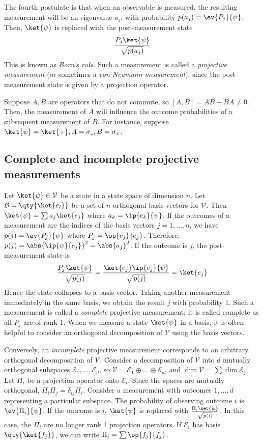 The fourth postulate is that when an observable is measured, the resulting measurement will be an eigenvalue \( a_j \), with probability \( p(a_j) = \ev{P_j}{\psi} \).
Then, \( \ket{\psi} \) is replaced with the post-measurement state
\[ \frac{P_j \ket{\psi}}{\sqrt{p(a_j)}} \]
This is known as \emph{Born's rule}.
Such a measurement is called a \emph{projective measurement} (or sometimes a \emph{von Neumann measurement}), since the post-measurement state is given by a projection operator.

Suppose \( A, B \) are operators that do not commute, so \( [A,B] = AB - BA \neq 0 \).
Then, the measurement of \( A \) will influence the outcome probabilities of a subsequent measurement of \( B \).
For instance, suppose \( \ket{\psi} = \ket{+}, A = \sigma_z, B = \sigma_x \).

\subsection{Complete and incomplete projective measurements}
Let \( \ket{\psi} \in \mathcal V \) be a state in a state space of dimension \( n \).
Let \( \mathcal B = \qty{\ket{e_i}} \) be a set of \( n \) orthogonal basis vectors for \( \mathcal V \).
Then \( \ket{\psi} = \sum a_j \ket{e_j} \) where \( a_k = \ip{e_k}{\psi} \).
If the outcomes of a measurement are the indices of the basis vectors \( j = 1, \dots, n \), we have \( p(j) = \ev{P_j}{\psi} \) where \( P_j = \op{e_j}{e_j} \).
Therefore, \( p(j) = \abs{\ip{\psi}{e_j}}^2 = \abs{a_j}^2 \).
If the outcome is \( j \), the post-measurement state is
\[ \frac{P_j \ket{\psi}}{\sqrt{p(j)}} = \frac{\ket{e_j} \ip{e_j}{\psi}}{\sqrt{p(j)}} = \ket{e_j} \]
Hence the state collapses to a basis vector.
Taking another measurement immediately in the same basis, we obtain the result \( j \) with probability 1.
Such a measurement is called a \emph{complete} projective measurement; it is called complete as all \( P_j \) are of rank 1.
When we measure a state \( \ket{\psi} \) in a basis, it is often helpful to consider an orthogonal decomposition of \( \mathcal V \) using the basis vectors.

Conversely, an \emph{incomplete} projective measurement corresponds to an arbitrary orthogonal decomposition of \( \mathcal V \).
Consider a decomposition of \( \mathcal V \) into \( d \) mutually orthogonal subspaces \( \mathcal E_1, \dots, \mathcal E_d \), so \( \mathcal V = \mathcal E_1 \oplus \dots \oplus \mathcal E_d \), and \( \dim \mathcal V = \sum \dim \mathcal E_j \).
Let \( \Pi_i \) be a projection operator onto \( \mathcal E_i \).
Since the spaces are mutually orthogonal, \( \Pi_i \Pi_j = \delta_{ij} \Pi_i \).
Consider a measurement with outcomes \( 1, \dots, d \) representing a particular subspace.
The probability of observing outcome \( i \) is \( \ev{\Pi_i}{\psi} \).
If the outcome is \( i \), \( \ket{\psi} \) is replaced with \( \frac{\Pi_i \ket{\psi}}{\sqrt{p(i)}} \).
In this case, the \( \Pi_i \) are no longer rank 1 projection operators.
If \( \mathcal E_i \) has basis \( \qty{\ket{f_j}} \), we can write \( \Pi_i = \sum \op{f_j}{f_j} \).


